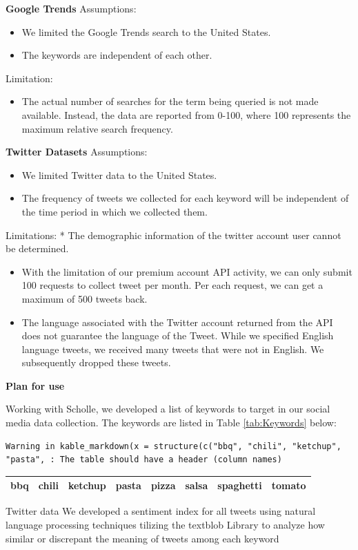\documentclass[12pt,oneside]{chicagocapstone}
\providecommand{\tightlist}{%
  \setlength{\itemsep}{0pt}\setlength{\parskip}{0pt}}
\begin{document}
\textbf{Google Trends} Assumptions:
\begin{itemize}
\item
  We limited the Google Trends search to the United States.
\item
  The keywords are independent of each other.
\end{itemize}
Limitation:
\begin{itemize}
\tightlist
\item
  The actual number of searches for the term being queried is not made
  available. Instead, the data are reported from 0-100, where 100
  represents the maximum relative search frequency.
\end{itemize}
\textbf{Twitter Datasets} Assumptions:
\begin{itemize}
\item
  We limited Twitter data to the United States.
\item
  The frequency of tweets we collected for each keyword will be
  independent of the time period in which we collected them.
\end{itemize}
Limitations: * The demographic information of the twitter account user
cannot be determined.
\begin{itemize}
\item
  With the limitation of our premium account API activity, we can only
  submit 100 requests to collect tweet per month. Per each request, we
  can get a maximum of 500 tweets back.
\item
  The language associated with the Twitter account returned from the API
  does not guarantee the language of the Tweet. While we specified
  English language tweets, we received many tweets that were not in
  English. We subsequently dropped these tweets.
\end{itemize}
\textbf{Plan for use}

Working with Scholle, we developed a list of keywords to target in our
social media data collection. The keywords are listed in Table
\ref{tab:Keywords} below:
\begin{verbatim}
Warning in kable_markdown(x = structure(c("bbq", "chili", "ketchup",
"pasta", : The table should have a header (column names)
\end{verbatim}
\begin{longtable}[]{@{}cccccccc@{}}
\toprule
bbq & chili & ketchup & pasta & pizza & salsa & spaghetti &
tomato\tabularnewline
\bottomrule
\end{longtable}
Twitter data We developed a sentiment index for all tweets using natural
language processing techniques tilizing the textblob Library to analyze
how similar or discrepant the meaning of tweets among each keyword
\end{document}
